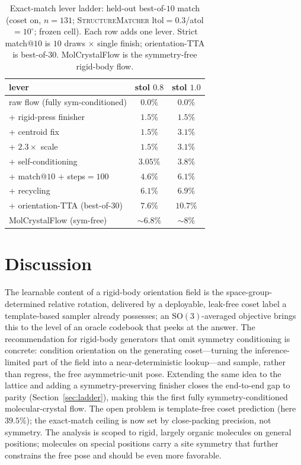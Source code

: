 \documentclass[10pt]{article}
\begin{document}
\begin{table}[t]
\centering
\caption{Exact-match lever ladder: held-out best-of-$10$ match (coset on,
$n{=}131$; \textsc{StructureMatcher} ltol$=0.3$/atol$=10^\circ$; frozen cell). Each
row adds one lever. Strict match@$10$ is $10$ draws $\times$ single finish;
orientation-TTA is best-of-$30$. MolCrystalFlow is the symmetry-free rigid-body
flow.}
\label{tab:ladder}
\begin{tabular}{lcc}
\toprule
lever & stol $0.8$ & stol $1.0$ \\
\midrule
raw flow (fully sym-conditioned)       & $0.0\%$ & $0.0\%$ \\
\quad + rigid-press finisher           & $1.5\%$ & $1.5\%$ \\
\quad + centroid fix                   & $1.5\%$ & $3.1\%$ \\
\quad + $2.3\times$ scale              & $1.5\%$ & $3.1\%$ \\
\quad + self-conditioning              & $3.05\%$& $3.8\%$ \\
\quad + match@$10$ + steps$=100$       & $4.6\%$ & $6.1\%$ \\
\quad + recycling                      & $\mathbf{6.1\%}$ & $\mathbf{6.9\%}$ \\
\quad + orientation-TTA (best-of-$30$) & $7.6\%$ & $\mathbf{10.7\%}$ \\
\midrule
MolCrystalFlow (sym-free)\cite{zeng2026molcrystalflow} & $\sim\!6.8\%$ & $\sim\!8\%$ \\
\bottomrule
\end{tabular}
\end{table}

\section{Discussion}
The learnable content of a rigid-body orientation field is the
space-group-determined relative rotation, delivered by a deployable, leak-free
coset label a template-based sampler already possesses; an
$\mathrm{SO}(3)$-averaged objective brings this to the level of an oracle codebook
that peeks at the answer. The recommendation for rigid-body generators that omit
symmetry conditioning\cite{zeng2026molcrystalflow} is concrete: condition
orientation on the generating coset---turning the inference-limited part of the
field into a near-deterministic lookup---and sample, rather than regress, the free
asymmetric-unit pose. Extending the same idea to the lattice and adding a
symmetry-preserving finisher closes the end-to-end gap to parity
(Section~\ref{sec:ladder}), making this the first fully symmetry-conditioned
molecular-crystal flow. The open problem is template-free coset prediction (here
$39.5\%$); the exact-match ceiling is now set by close-packing precision, not
symmetry. The analysis is scoped to rigid, largely organic molecules on general
positions; molecules on special positions carry a site symmetry that further
constrains the free pose and should be even more favorable.
\end{document}
